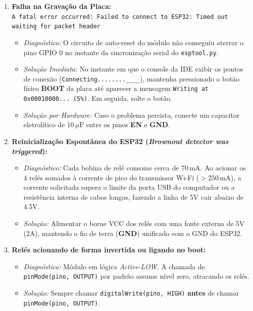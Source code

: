 \documentclass[a4paper,11pt]{article}
\begin{document}
\begin{enumerate}[leftmargin=*]
    \item \textbf{Falha na Gravação da Placa:}\\
    {\footnotesize\texttt{A fatal error occurred: Failed to connect to ESP32: Timed out waiting for packet header}}
    \begin{itemize}
        \item \textit{Diagnóstico:} O circuito de auto-reset do módulo não conseguiu aterrar o pino GPIO 0 no instante da sincronização serial do \texttt{esptool.py}.
        \item \textit{Solução Imediata:} No instante em que o console da IDE exibir os pontos de conexão (\texttt{Connecting........\_\_\_\_}), mantenha pressionado o botão físico \textbf{BOOT} da placa até aparecer a mensagem \texttt{Writing at 0x00010000... (5\%)}. Em seguida, solte o botão.
        \item \textit{Solução por Hardware:} Caso o problema persista, conecte um capacitor eletrolítico de $10\,\mu\text{F}$ entre os pinos \textbf{EN} e \textbf{GND}.
    \end{itemize}

    \item \textbf{Reinicialização Espontânea do ESP32 (\textit{Brownout detector was triggered}):}
    \begin{itemize}
        \item \textit{Diagnóstico:} Cada bobina de relé consome cerca de $70\,\text{mA}$. Ao acionar os 4 relés somados à corrente de pico do transmissor Wi-Fi ($>250\,\text{mA}$), a corrente solicitada supera o limite da porta USB do computador ou a resistência interna de cabos longos, fazendo a linha de 5V cair abaixo de 4.5V.
        \item \textit{Solução:} Alimentar o borne VCC dos relés com uma fonte externa de 5V (2A), mantendo o fio de terra (\textbf{GND}) unificado com o GND do ESP32.
    \end{itemize}

    \item \textbf{Relés acionando de forma invertida ou ligando no boot:}
    \begin{itemize}
        \item \textit{Diagnóstico:} Módulo em lógica \textit{Active-LOW}. A chamada de \texttt{pinMode(pino, OUTPUT)} por padrão assume nível zero, atracando os relés.
        \item \textit{Solução:} Sempre chamar \texttt{digitalWrite(pino, HIGH)} \textbf{antes} de chamar \texttt{pinMode(pino, OUTPUT)}.
    \end{itemize}
\end{enumerate}
\end{document}
